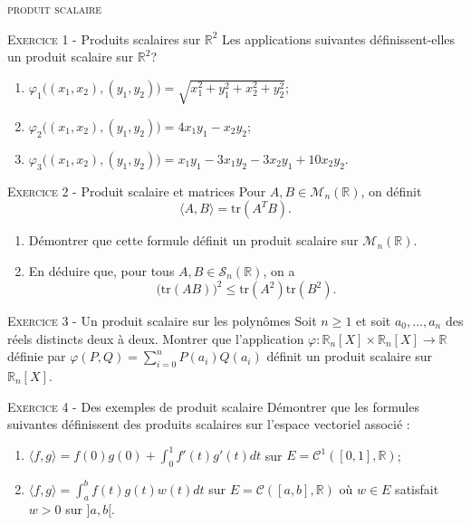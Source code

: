 \documentclass[11pt]{article}
\begin{document}
 

\begin{center}\textsc{{\huge produit scalaire }}\end{center}



\vskip0.3cm\noindent\textsc{Exercice 1} - Produits scalaires sur $\mathbb R^2$
\vskip0.2cm
Les applications suivantes définissent-elles un produit scalaire sur $\mathbb R^2$?
\begin{enumerate}
 \item $\varphi_1\big((x_1,x_2),(y_1,y_2)\big)=\sqrt{x_1^2+y_1^2+x_2^2+y_2^2}$;
 \item $\varphi_2\big((x_1,x_2),(y_1,y_2)\big)=4x_1y_1-x_2y_2$;
 \item $\varphi_3\big((x_1,x_2),(y_1,y_2)\big)=x_1y_1-3x_1y_2-3x_2y_1+10x_2y_2$.
\end{enumerate}




\vskip0.3cm\noindent\textsc{Exercice 2} - Produit scalaire et matrices
\vskip0.2cm
Pour $A,B\in\mathcal M_n(\mathbb R)$, on définit
$$\langle A,B\rangle=\textrm{tr}(A^T B).$$
\begin{enumerate}
\item Démontrer que cette formule définit un produit scalaire sur $\mathcal M_n(\mathbb R)$.
\item En déduire que, pour tous $A,B\in\mathcal S_n(\mathbb R)$, on a
$$\big(\textrm{tr}(AB))^2\leq \textrm{tr}(A^2)\textrm{tr}(B^2).$$
\end{enumerate}




\vskip0.3cm\noindent\textsc{Exercice 3} - Un produit scalaire sur les polynômes
\vskip0.2cm
Soit $n\geq 1$ et soit $a_0,\dots,a_n$ des réels distincts deux à deux. Montrer que l'application $\varphi:\mathbb R_n[X]\times\mathbb R_n[X]\to\mathbb R$
définie par $\varphi(P,Q)=\sum_{i=0}^n P(a_i)Q(a_i)$ définit un produit scalaire sur $\mathbb R_n[X]$.




\vskip0.3cm\noindent\textsc{Exercice 4} - Des exemples de produit scalaire
\vskip0.2cm
Démontrer que les formules suivantes définissent des produits scalaires sur l'espace vectoriel associé :
\begin{enumerate}
\item $\langle f,g\rangle=f(0)g(0)+\int_0^1 f'(t)g'(t)dt$ sur $E=\mathcal C^1([0,1],\mathbb R)$;
\item $\langle f,g\rangle=\int_a^b f(t)g(t)w(t)dt$ sur $E=\mathcal C([a,b],\mathbb R)$ où $w\in E$ satisfait $w>0$ sur $]a,b[$.
\end{enumerate}
\end{document}
